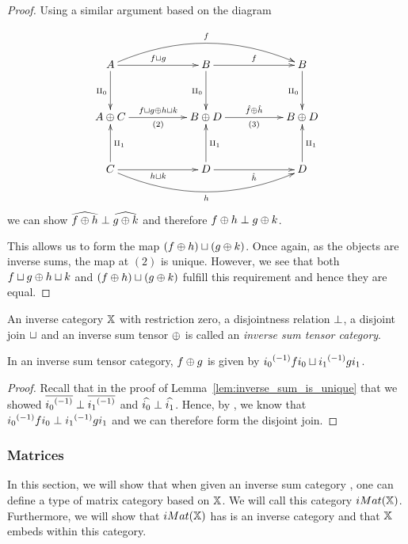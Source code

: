 \begin{proof}
  Using a similar argument based on the diagram

  \[
    \xymatrix@R+10pt@C+28pt {
      A \ar[r]^{f\djoin g} \ar[d]_{\cpa} \ar@/^20pt/[rr]^f
        & B \ar[r]^{f} \ar[d]_{\cpa}  & B \ar[d]_{\cpa}\\
      A\+C  \ar[r]^{f\djoin g \+ h\djoin k}_{(2)}
        & B\+D \ar[r]^{\rg{f}\+\rg{h}}_{(3)}   & B \+D \\
      C  \ar[r]_{h\djoin k} \ar[u]_{\cpb} \ar@/_20pt/[rr]_h
        & D\ar[r]_{\rg{h}} \ar[u]_{\cpb}  & D \ar[u]_{\cpb}
    }
  \]
  we can show $\widehat{f\oplus h} \perp \widehat{g\oplus k}$ and therefore $f\oplus h \perp g\oplus k$.

  This allows us to form the map $(f\oplus h) \sqcup (g\oplus k)$. Once again, as the objects are inverse
  sums, the map at $(2)$ is unique.
  However, we see that both $f\sqcup g \oplus h\sqcup k$ and $(f\oplus h) \sqcup (g\oplus k)$ fulfill this
  requirement and hence they are equal.
\end{proof}


\begin{definition}\label{def:inverse_sum_tensor_category}
  An inverse category $\mathbb{X}$ with restriction zero, a disjointness relation $\perp$, a disjoint
  join $\sqcup$ and an inverse sum tensor $\oplus$ is called an \emph{inverse sum tensor category}.
\end{definition}

\begin{corollary}\label{cor:inverse_sum_of_maps_is_disjoint_join}
  In an inverse sum tensor category, $f \oplus g$ is given by ${i_0}^{(-1)} f i_0 \sqcup {i_1}^{(-1)} g i_1$.
\end{corollary}
\begin{proof}
  Recall that in the proof of Lemma~\ref{lem:inverse_sum_is_unique} that we showed $\overline{{i_0}^{(-1)}}
  \perp \overline{{i_1}^{(-1)}}$ and $\widehat{i_0}\perp \widehat{i_1}$. Hence, by , we know that
  ${i_0}^{(-1)} f i_0 \perp {i_1}^{(-1)} g i_1$ and we can therefore form the disjoint join.
\end{proof}



\subsubsection{Matrices} %
\label{ssub:matrix_representation}
In this section, we will show that when given an inverse sum category \X, one can define a
type of matrix category based on $\mathbb{X}$. We will call this category $iMat(\mathbb{X})$. Furthermore, we will
show that $iMat(\mathbb{X})$ has is an inverse category and that $\mathbb{X}$ embeds within this category.

